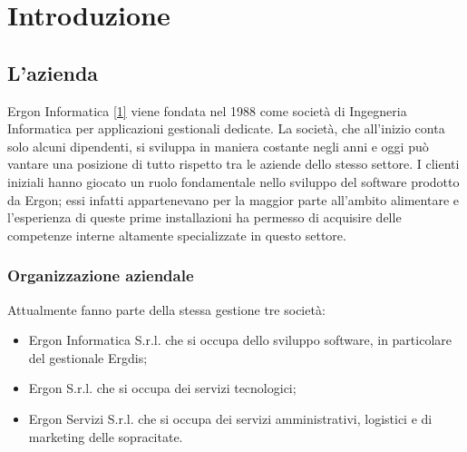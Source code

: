 
\chapter{Introduzione}
\label{cap:introduzione}

\section{L'azienda}

Ergon Informatica \hyperref[sec:ergon]{[1]} viene fondata nel 1988 come società di Ingegneria Informatica per applicazioni gestionali dedicate.
La società, che all'inizio conta solo alcuni dipendenti, si sviluppa in maniera costante negli anni e oggi può vantare una posizione di tutto rispetto tra le aziende dello stesso settore.
I clienti iniziali hanno giocato un ruolo fondamentale nello sviluppo del software prodotto da Ergon; essi infatti appartenevano per la maggior parte all'ambito alimentare e l'esperienza di queste prime installazioni ha permesso di acquisire delle competenze interne altamente specializzate in questo settore.
\subsection{Organizzazione aziendale}
Attualmente fanno parte della stessa gestione tre società:

\begin{itemize}
\item Ergon Informatica S.r.l. che si occupa dello sviluppo software, in particolare del gestionale Ergdis;
\item Ergon S.r.l. che si occupa dei servizi tecnologici;
\item Ergon Servizi S.r.l. che si occupa dei servizi amministrativi, logistici e di marketing delle sopracitate.
\end{itemize}
\newpage
